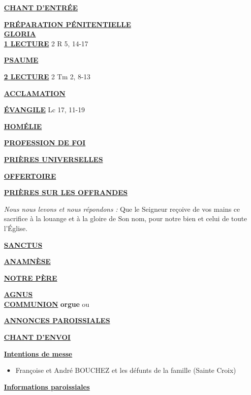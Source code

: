 \documentclass[french,11pt]{article}
\newcommand*{\chants}{../chants}
\newcommand*{\messe}{../messe_du_peuple_de_dieu}
\newcommand*{\pu}{../pu}
\newcommand*{\psaumes}{../psaumes}
\newcommand{\NewsItem}[1]{%
\vspace{3pt}
\underline{\textbf{#1}}
		  }
\begin{document}
\NewsItem{CHANT D'ENTRÉE}
	

\NewsItem{PRÉPARATION PÉNITENTIELLE}\\
	

\NewsItem{GLORIA}\\
	


\NewsItem{1\iere{} LECTURE} 2 R 5, 14-17

\NewsItem{PSAUME}


\NewsItem{2\ieme{} LECTURE} 2 Tm 2, 8-13

\NewsItem{ACCLAMATION}


\NewsItem{ÉVANGILE} Lc 17, 11-19

\NewsItem{HOMÉLIE}

\NewsItem{PROFESSION DE FOI}
%


\NewsItem{PRIÈRES UNIVERSELLES}


\NewsItem{OFFERTOIRE}

\NewsItem{PRIÈRES SUR LES OFFRANDES}
\textit{Nous nous levons et nous répondons : }
Que le Seigneur reçoive de vos mains ce sacrifice à la louange et à la gloire
de Son nom, pour notre bien et celui de toute l’Église.


\NewsItem{SANCTUS}


\NewsItem{ANAMNÈSE}


\NewsItem{NOTRE PÈRE}

\NewsItem{AGNUS} \\


\NewsItem{COMMUNION} \textbf{orgue} ou


\NewsItem{ANNONCES PAROISSIALES}


\NewsItem{CHANT D'ENVOI}


\newpage

\NewsItem{Intentions de messe}
\begin{itemize}
\item[\Cross] Françoise et André BOUCHEZ et les défunts de la famille (Sainte Croix)
\end{itemize}

\NewsItem{Informations paroissiales}
\end{document}
